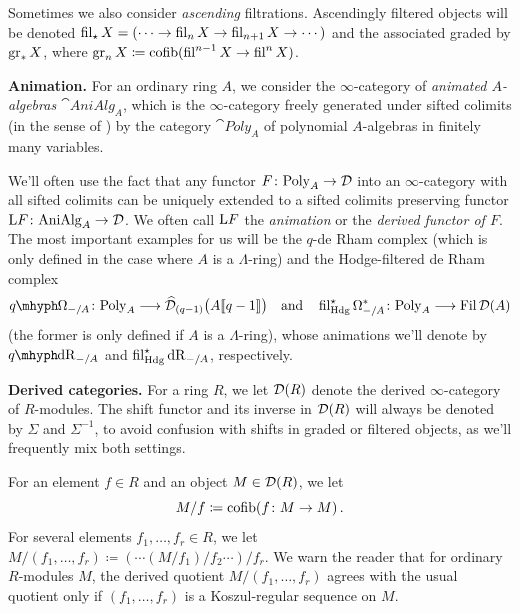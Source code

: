 \documentclass[DIV=12,numbers=enddot,leqno,bibliography=totoc]{scrartcl}
\begin{document}
\begin{numpar}
\begin{alphanumerate}
			Sometimes we also consider \emph{ascending} filtrations. Ascendingly filtered objects will be denoted $\operatorname{fil}_\star X=(\dotsb\rightarrow \operatorname{fil}_nX\rightarrow \operatorname{fil}_{n+1}X\rightarrow \dotsb)$ and the associated graded by $\operatorname{gr}_*X$, where $\gr_nX\coloneqq \cofib(\fil^{n-1}X\rightarrow \fil^nX)$.
			
			\item \textbf{Animation.} For an ordinary ring $A$, we consider the $\infty$-category of \emph{animated $A$-algebras $\cat{AniAlg}_A$}, which is the $\infty$-category freely generated under sifted colimits (in the sense of \cite[Proposition~]{HTT}) by the category $\cat{Poly}_A$ of polynomial $A$-algebras in finitely many variables.
			
			We'll often use the fact that any functor $F\colon \cat{Poly}_A\rightarrow \Dd$ into an $\infty$-category with all sifted colimits can be uniquely extended to a sifted colimits preserving functor $\L F\colon \cat{AniAlg}_A\rightarrow \Dd$. We often call $\mathrm{L} F$ the \emph{animation} or the \emph{ derived functor of $F$}. The most important examples for us will be the $q$-de Rham complex  (which is only defined in the case where $A$ is a $\Lambda$-ring) and the Hodge-filtered de Rham complex
			\begin{equation*}
				\qOmega_{-/A}\colon \cat{Poly}_A\longrightarrow \widehat{\Dd}_{(q-1)}\bigl(A\qpower\bigr)\quad\text{and}\quad \fil_{\Hodge}^\star\Omega_{-/A}^*\colon \cat{Poly}_A\longrightarrow \Fil\Dd(A)
			\end{equation*}
			(the former is only defined if $A$ is a $\Lambda$-ring), whose animations we'll denote by $\qdeRham_{-/A}$ and $\operatorname{fil}_{\mathrm{Hdg}}^\star\mathrm{dR}_{-/A}$, respectively.%
			
			\item \textbf{Derived categories.} For a ring $R$, we let $\mathcal{D}(R)$ denote the derived $\infty$-category of $R$-modules. The shift functor and its inverse in $\mathcal{D}(R)$ will always be denoted by $\Sigma$ and $\Sigma^{-1}$, to avoid confusion with shifts in graded or filtered objects, as we'll frequently mix both settings.
			
			For an element $f\in R$ and an object $M\in \mathcal{D}(R)$, we let  \begin{equation*}
				M/f\coloneqq \cofib\left(f\colon M\rightarrow M\right)\,.
			\end{equation*}
			For several elements $f_1,\dotsc,f_r\in R$, we let $M/(f_1,\dotsc,f_r)\coloneqq (\dotsb(M/f_1)/f_2\dotsb)/f_r$. We warn the reader that for ordinary $R$-modules $M$, the derived quotient $M/(f_1,\dotsc,f_r)$ agrees with the usual quotient only if $(f_1,\dotsc,f_r)$ is a Koszul-regular sequence on $M$.
			

\end{alphanumerate}
\end{numpar}
\end{document}
